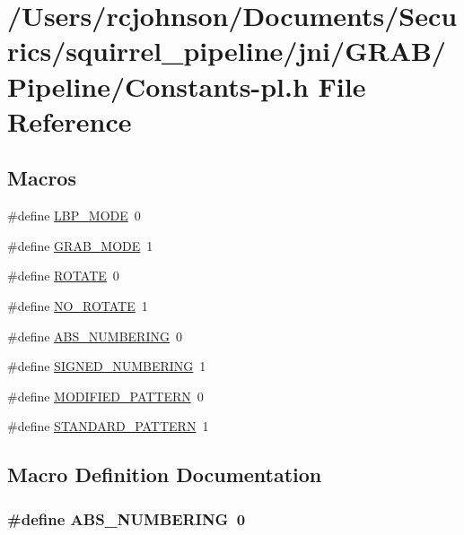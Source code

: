 \hypertarget{_constants-pl_8h}{\section{/\-Users/rcjohnson/\-Documents/\-Securics/squirrel\-\_\-pipeline/jni/\-G\-R\-A\-B/\-Pipeline/\-Constants-\/pl.h File Reference}
\label{_constants-pl_8h}
}
\subsection*{Macros}
\begin{DoxyCompactItemize}
\item 
\#define \hyperlink{_constants-pl_8h_a6b33b99442f7c7d9e94f003528a86501}{L\-B\-P\-\_\-\-M\-O\-D\-E}~0
\item 
\#define \hyperlink{_constants-pl_8h_a66425a38b0c7937c73f50847524a3595}{G\-R\-A\-B\-\_\-\-M\-O\-D\-E}~1
\item 
\#define \hyperlink{_constants-pl_8h_ae38c87f421906975bf7500c3b779fbd1}{R\-O\-T\-A\-T\-E}~0
\item 
\#define \hyperlink{_constants-pl_8h_ad30aa04d0c2e0be52306deb2c60dff35}{N\-O\-\_\-\-R\-O\-T\-A\-T\-E}~1
\item 
\#define \hyperlink{_constants-pl_8h_a43697bbe14a19b7bfd3bc3a8966ffc24}{A\-B\-S\-\_\-\-N\-U\-M\-B\-E\-R\-I\-N\-G}~0
\item 
\#define \hyperlink{_constants-pl_8h_a591937bc56bfef3fd4e606da1e9bb6e1}{S\-I\-G\-N\-E\-D\-\_\-\-N\-U\-M\-B\-E\-R\-I\-N\-G}~1
\item 
\#define \hyperlink{_constants-pl_8h_a3d2cac756a32f6fc8a16ea6bf5f7fa64}{M\-O\-D\-I\-F\-I\-E\-D\-\_\-\-P\-A\-T\-T\-E\-R\-N}~0
\item 
\#define \hyperlink{_constants-pl_8h_a5daa478426a73c9de86ceb44488ca3d8}{S\-T\-A\-N\-D\-A\-R\-D\-\_\-\-P\-A\-T\-T\-E\-R\-N}~1
\end{DoxyCompactItemize}


\subsection{Macro Definition Documentation}
\hypertarget{_constants-pl_8h_a43697bbe14a19b7bfd3bc3a8966ffc24}{
\subsubsection[{A\-B\-S\-\_\-\-N\-U\-M\-B\-E\-R\-I\-N\-G}]{\setlength{\rightskip}{0pt plus 5cm}\#define A\-B\-S\-\_\-\-N\-U\-M\-B\-E\-R\-I\-N\-G~0}}\label{_constants-pl_8h_a43697bbe14a19b7bfd3bc3a8966ffc24}


